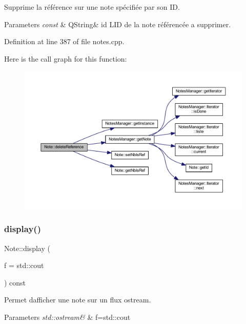 Supprime la référence sur une note spécifiée par son ID. 


\begin{DoxyParams}{Parameters}
{\em const} & Q\+String\& id L\textquotesingle{}ID de la note référencée a supprimer. \\
\hline
\end{DoxyParams}


Definition at line 387 of file notes.\+cpp.

Here is the call graph for this function\+:\nopagebreak
\begin{figure}[H]
\begin{center}
\leavevmode
\includegraphics[width=350pt]{class_note_a91c86cf6ed18e4badb59a41e737a15fa_cgraph}
\end{center}
\end{figure}
\mbox{\label{class_note_a0398c75a4e1516fd8455bd3513151b8b}} 
\subsubsection{\texorpdfstring{display()}{display()}}
{\footnotesize\ttfamily Note\+::display (\begin{DoxyParamCaption}\item[{std\+::ostream \&}]{f = {\ttfamily std\+:\+:cout} }\end{DoxyParamCaption}) const\hspace{0.3cm}{\ttfamily [inline]}}



Permet d\textquotesingle{}afficher une note sur un flux ostream. 


\begin{DoxyParams}{Parameters}
{\em std\+::ostream\&} & f=std\+::cout \\
\hline
\end{DoxyParams}



